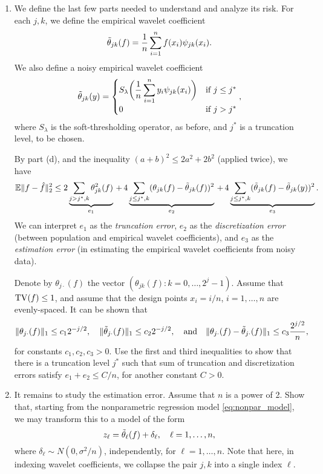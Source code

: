 \documentclass{article}
\begin{document}
\begin{enumerate}[label=(\alph*)]
\item We define the last few parts needed to understand \smash{$\hf$} and 
  analyze its risk. For each $j,k$, we define the empirical wavelet coefficient 
  \[
  \tilde\theta_{jk}(f) = \frac{1}{n} \sum_{i=1}^n f(x_i) \psi_{jk}(x_i).
  \] 
  We also define a noisy empirical wavelet coefficient 
  \[
  \tilde\theta_{jk}(y) = \begin{cases}
  \displaystyle
  S_\lambda \bigg( \frac{1}{n} \sum_{i=1}^n y_i \psi_{jk}(x_i) 
  \bigg) & \text{if $j \leq j^*$} \\
  0 & \text{if $j > j ^*$}
  \end{cases},
  \]
  where $S_\lambda$ is the soft-thresholding operator, as before, and $j^*$ is a
  truncation level, to be chosen. 

  By part (d), and the inequality $(a+b)^2 \leq 2a^2 + 2b^2$ (applied twice), we
  have 
  \[
  \mathbb{E} \|f - \hat{f}\|_2^2 \leq 2\underbrace{\sum_{j > j^*,k} \theta_{jk}^2(f)}_{e_1}  
  \,+\,
  4\underbrace{\sum_{j \leq j^*,k} (\theta_{jk}(f) - \tilde\theta_{jk}(f))^2}_{e_2}
  \,+\, 
  4\underbrace{\sum_{j \leq j^*,k} (\tilde\theta_{jk}(f) - \tilde\theta_{jk}(y))^2}_{e_3}.
  \]
  We can interpret $e_1$ as the \emph{truncation error}, $e_2$ as the
  \emph{discretization error} (between population and empirical wavelet
  coefficients), and $e_3$ as the \emph{estimation error} (in estimating the
  empirical wavelet coefficients from noisy data). 
  
  Denote by $\theta_{j \cdot}(f)$ the vector $(\theta_{jk}(f) : k =
  0,\dots,2^j-1)$. Assume that $\mathrm{TV}(f) \leq 1$, and assume that the design
  points $x_i = i/n$, $i=1,\dots,n$ are evenly-spaced. It can be shown that 
  \begin{equation}
  \label{eq:besov_condition}
  \| \theta_{j \cdot}(f) \|_1 \leq c_1 2^{-j/2}, \quad
  \| \tilde\theta_{j \cdot}(f) \|_1 \leq c_2 2^{-j/2}, \quad \text{and} \quad 
  \| \theta_{j \cdot}(f) - \tilde\theta_{j \cdot}(f) \|_1 \leq c_3 \frac{2^{j/2}}{n}, 
  \end{equation}
  for constants $c_1,c_2,c_3> 0$. Use the first and third inequalities to show 
  that there is a truncation level $j^*$ such that sum of truncation and
  discretization errors satisfy $e_1 + e_2 \leq C/n$, for another constant
  $C>0$.       
  \marginpar{\small [2 pts]}

\item It remains to study the estimation error. Assume that $n$ is a power of
  2. Show that, starting from the nonparametric regression model
  \eqref{eq:nonpar_model}, we may transform this to a model of the form   
  \marginpar{\small [3 pts]}
  \[
  z_\ell = \tilde\theta_\ell(f) + \delta_\ell, \quad \ell=1,\dots,n,
  \]
  where $\delta_\ell \sim N(0,\sigma^2/n)$, independently, for
  $\ell=1,\dots,n$. Note that here, in indexing wavelet coefficients, we
  collapse the pair $j,k$ into a single index $\ell$. 


\end{enumerate}
\end{document}
